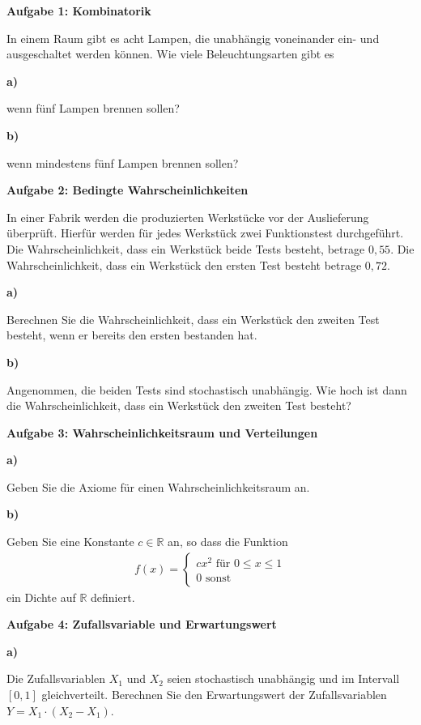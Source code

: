 \documentclass[a4paper,12pt]{article}
\begin{document}
{\bf Aufgabe 1: Kombinatorik}

In einem Raum gibt es acht Lampen, die unabhängig voneinander ein- und ausgeschaltet werden können.
Wie viele Beleuchtungsarten gibt es

{\bf a)  }

wenn fünf Lampen brennen sollen?

{\bf b) }

wenn mindestens fünf Lampen brennen sollen?

\hspace{10mm}

{\bf Aufgabe 2: Bedingte Wahrscheinlichkeiten}

In einer Fabrik werden die produzierten Werkstücke vor der Auslieferung überprüft. Hierfür werden für jedes Werkstück   zwei Funktionstest durchgeführt.  Die Wahrscheinlichkeit, dass ein Werkstück beide Tests besteht, betrage $0,55$. Die Wahrscheinlichkeit, dass ein Werkstück  den ersten Test besteht betrage $0,72$. 

{\bf a)  }

Berechnen Sie die Wahrscheinlichkeit, dass ein Werkstück den zweiten Test besteht, wenn er bereits den ersten bestanden hat.

{\bf b) }

Angenommen, die beiden Tests sind stochastisch unabhängig. Wie hoch ist dann die Wahrscheinlichkeit, dass ein Werkstück den zweiten Test besteht?

\hspace{10mm}

{\bf Aufgabe 3: Wahrscheinlichkeitsraum und Verteilungen}

{\bf a) }

Geben Sie die Axiome für einen Wahrscheinlichkeitsraum an. 

{\bf b)  }

Geben Sie eine Konstante $c  \in \mathbb{R}$ an, so dass die Funktion 
\begin{align*}
f(x) = \begin{cases} c x^2 \text{ für }  0\leq x \leq 1 \\ 0 \text{ sonst}\end{cases}
\end{align*}
ein Dichte auf $\mathbb{R}$ definiert.

\newpage

{\bf Aufgabe 4: Zufallsvariable und Erwartungswert}

{\bf a)  }

Die Zufallsvariablen $X_1$ und $X_2$ seien stochastisch unabhängig   und im Intervall $[0,1]$ gleichverteilt.
Berechnen Sie den Erwartungswert der Zufallsvariablen $Y = X_1 \cdot (X_2 - X_1)$.
\end{document}
